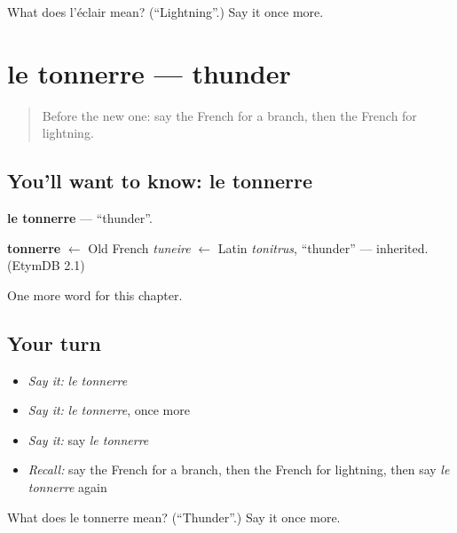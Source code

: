 \begin{tcolorbox}[breakable,colback=teal!4,colframe=teal!35!black,title={Before you move on}]
What does l'éclair mean? (\textquotedblleft{}Lightning\textquotedblright{}.) Say it once more.
\end{tcolorbox}
\section[le tonnerre]{le tonnerre — thunder}

\label{lesson:FR-C229-tonnerre}



\begin{quote}
Before the new one: say the French for a branch, then the French for lightning.
\end{quote}

\subsection*{You'll want to know: le tonnerre}
\textbf{le tonnerre} — \textquotedblleft{}thunder\textquotedblright{}.

\begin{cousinweb}
\textbf{tonnerre} $\leftarrow$ Old French \emph{tuneire} $\leftarrow$ Latin \emph{tonitrus}, \textquotedblleft{}thunder\textquotedblright{} — inherited. (EtymDB 2.1)
\end{cousinweb}

\begin{grammarlens}[title={What you've built}]
One more word for this chapter.
\end{grammarlens}

\subsection*{Your turn}
\begin{itemize}
\raggedright
  \item \emph{Say it:} \emph{le tonnerre}
  \item \emph{Say it:} \emph{le tonnerre}, once more
  \item \emph{Say it:} say \emph{le tonnerre}
  \item \emph{Recall:} say the French for a branch, then the French for lightning, then say \emph{le tonnerre} again
\end{itemize}

\begin{tcolorbox}[breakable,colback=teal!4,colframe=teal!35!black,title={Before you move on}]
What does le tonnerre mean? (\textquotedblleft{}Thunder\textquotedblright{}.) Say it once more.
\end{tcolorbox}
